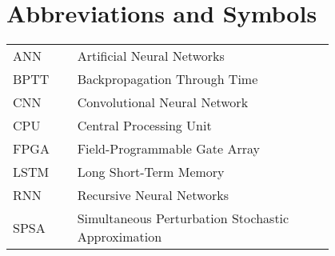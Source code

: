 \chapter*{Abbreviations and Symbols}

\begin{flushleft}
\begin{tabular}{l p{0.8\linewidth}}
ANN      & Artificial Neural Networks\\
BPTT     & Backpropagation Through Time\\
CNN      & Convolutional Neural Network\\
CPU      & Central Processing Unit\\
FPGA     & Field-Programmable Gate Array\\
LSTM     & Long Short-Term Memory\\
RNN      & Recursive Neural Networks\\
SPSA     & Simultaneous Perturbation Stochastic Approximation\\
\end{tabular}
\end{flushleft}

